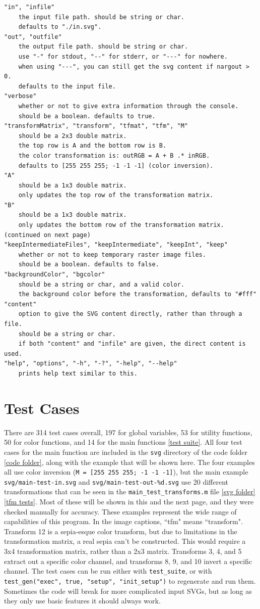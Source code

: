 \documentclass[12pt]{article}
\newcommand \iindent  {\indent \indent}
\newcommand \iiindent {\indent \iindent}
\begin{document}
\begin{verbatim}
"in", "infile"
    the input file path. should be string or char.
    defaults to "./in.svg".
"out", "outfile"
    the output file path. should be string or char.
    use "-" for stdout, "--" for stderr, or "---" for nowhere.
    when using "---", you can still get the svg content if nargout > 0.
    defaults to the input file.
"verbose"
    whether or not to give extra information through the console.
    should be a boolean. defaults to true.
"transformMatrix", "transform", "tfmat", "tfm", "M"
    should be a 2x3 double matrix.
    the top row is A and the bottom row is B.
    the color transformation is: outRGB = A + B .* inRGB.
    defaults to [255 255 255; -1 -1 -1] (color inversion).
"A"
    should be a 1x3 double matrix.
    only updates the top row of the transformation matrix.
"B"
    should be a 1x3 double matrix.
    only updates the bottom row of the transformation matrix.
(continued on next page)
"keepIntermediateFiles", "keepIntermediate", "keepInt", "keep"
    whether or not to keep temporary raster image files.
    should be a boolean. defaults to false.
"backgroundColor", "bgcolor"
    should be a string or char, and a valid color.
    the background color before the transformation, defaults to "#fff"
"content"
    option to give the SVG content directly, rather than through a file.
    should be a string or char.
    if both "content" and "infile" are given, the direct content is used.
"help", "options", "-h", "-?", "-help", "--help"
    prints help text similar to this.
\end{verbatim}

\section{Test Cases}

\iiindent There are 314 test cases overall, 197 for global variables, 53 for utility
functions, 50 for color functions, and 14 for the main functions \ref{test suite}.
All four test cases for the main function are included in the {\tt svg} directory
of the code folder \ref{code folder}, along with the example that will be shown here.
The four examples all use color inversion ({\tt M = [255 255 255; -1 -1 -1]}), but
the main example {\tt svg/main-test-in.svg} and {\tt svg/main-test-out-\%d.svg} use
20 different transformations that can be seen in the {\tt main\_test\_transforms.m}
file \ref{svg folder}\ref{tfm tests}. Most of these will be shown in this and the
next page, and they were checked manually for accuracy. These examples represent the
wide range of capabilities of this program. In the image captions, ``tfm" means
``transform". Transform 12 is a sepia-esque color transform, but due to limitations
in the transformation matrix, a real sepia can't be constructed. This would require
a 3x4 transformation matrix, rather than a 2x3 matrix. Transforms 3, 4, and 5 extract
out a specific color channel, and transforms 8, 9, and 10 invert a specific channel. The test cases can be run either with {\tt test\_suite}, or with
{\tt test\_gen("exec", true, "setup", "init\_setup")} to regenerate and run them.
Sometimes the code will break for more complicated input SVGs, but as long as they
only use basic features it should always work.
\end{document}
